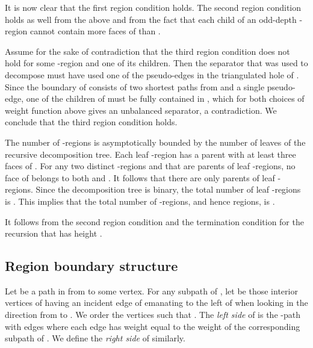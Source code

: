 \documentclass[11pt]{article}
\begin{document}
It is now clear that the first region condition holds. The second region condition holds as well from the above and from the fact that each child of an odd-depth -region  cannot contain more faces of  than .

Assume for the sake of contradiction that the third region condition does not hold for some -region  and one of its children. Then the separator that was used to decompose  must have used one of the pseudo-edges in the triangulated hole  of . Since the boundary of  consists of two shortest paths from  and a single pseudo-edge, one of the children of  must be fully contained in , which for both choices of weight function above gives an unbalanced separator, a contradiction. We conclude that the third region condition holds.

The number of -regions is asymptotically bounded by the number of leaves of the recursive decomposition tree. Each leaf -region has a parent with at least three faces of . For any two distinct -regions  and  that are parents of leaf -regions, no face of  belongs to both  and . It follows that there are only  parents of leaf -regions. Since the decomposition tree  is binary, the total number of leaf -regions is . This implies that the total number of -regions, and hence regions, is .

It follows from the second region condition and the termination condition for the recursion that  has height .

\subsection{Region boundary structure}
Let  be a path in  from  to some vertex. For any subpath  of , let  be those interior vertices of  having an incident edge of  emanating to the left of  when looking in the direction from  to . We order the vertices such that . The \emph{left side} of  is the -path with edges  where each edge has weight equal to the weight of the corresponding subpath of . We define the \emph{right side} of  similarly.
\end{document}
